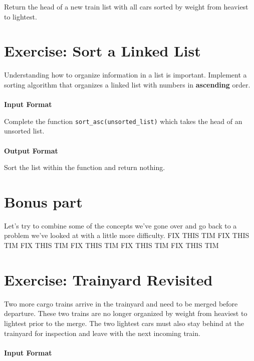 \documentclass{42-en}
\begin{document}
    Return the head of a new train list with all cars sorted by weight from
    heaviest to lightest.

\nextexercice

\chapter{Exercise\exercicenumber: Sort a Linked List}

\exnumber{\exercicenumber}

\makeheaderfiles
    Understanding how to organize information in a list is important. Implement
    a sorting algorithm that organizes a linked list with numbers in
    \textbf{ascending} order.
    \\
    \\
    \textbf{Input Format}
    
    Complete the function \texttt{sort\_asc(unsorted\_list)} which takes the head
    of an unsorted list.
    \\
    \\
    \textbf{Output Format}
    
    Sort the list within the function and return nothing.

\chapter{Bonus part}
    Let's try to combine some of the concepts we've gone over and go back to
    a problem we've looked at with a little more difficulty.
FIX THIS TIM FIX THIS TIM FIX THIS TIM FIX THIS TIM FIX THIS TIM FIX THIS TIM 


\nextexercice

\chapter{Exercise\exercicenumber: Trainyard Revisited}

\exnumber{\exercicenumber}

\makeheaderfiles
    Two more cargo trains arrive in the trainyard and need to be merged before
    departure. These two trains are no longer organized by weight from heaviest
    to lightest prior to the merge. The two lightest cars must also stay behind
    at the trainyard for inspection and leave with the next incoming train.
    \\
    \\
    \textbf{Input Format}
    
\end{document}
